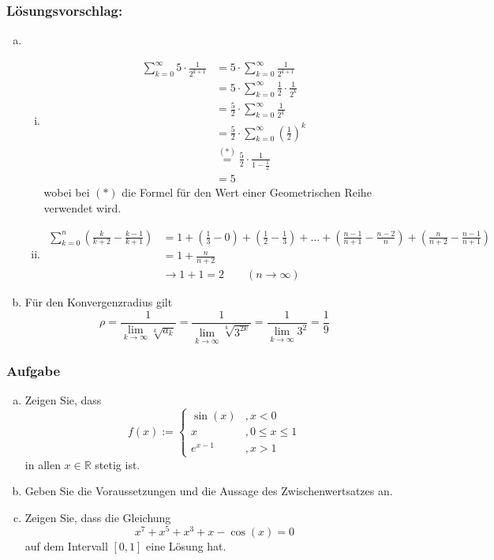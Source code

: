 \documentclass[a4paper,11pt]{scrartcl}
\newcounter{auf}
\newcommand{\Aufgabe}%
        {\addtocounter{auf}{1} \subsubsection*{\rmfamily  Aufgabe \theauf \hspace{1em}} }
\newcommand{\RR}{\mathbb{R}}
\begin{document}
\subsubsection*{Lösungsvorschlag:}
\begin{enumerate}[a)]
\item 
	\begin{enumerate}[i)]
	\item \begin{align*}
	\sum \limits_{k=0}^\infty 5\cdot \frac{1}{2^{k+1}}&=5 \cdot \sum \limits_{k=0}^\infty \frac{1}{2^{k+1}}\\
	 &=5 \cdot \sum \limits_{k=0}^\infty \frac{1}{2}\cdot\frac{1}{2^{k}} \\
	 &=\frac{5}{2} \cdot \sum \limits_{k=0}^\infty \frac{1}{2^{k}} \\
	 &=\frac{5}{2} \cdot \sum \limits_{k=0}^\infty \left(\frac{1}{2}\right)^{k} \\
	 &\stackrel{(*)}{=}\frac{5}{2} \cdot \frac{1}{1-\frac{1}{2}}\\
	 &=5
	 \end{align*}
	 wobei bei $(*)$ die Formel für den Wert einer Geometrischen Reihe verwendet wird.
	\item \begin{align*}
	\sum \limits_{k=0}^n\left( \frac{k}{k+2}-\frac{k-1}{k+1}\right)&=1+\left( \frac{1}{3}-0\right)+\left(\frac{1}{2}-\frac{1}{3}\right)+...+\left(\frac{n-1}{n+1}-\frac{n-2}{n} \right)+\left(\frac{n}{n+2}-\frac{n-1}{n+1} \right)\\
	&= 1+\frac{n}{n+2}\\
	&\to 1+1=2 \qquad (n \to \infty)
	\end{align*}
	\end{enumerate}
\item Für den Konvergenzradius gilt
$$
\rho=\frac{1}{\lim \limits_{k \to \infty} \sqrt[k]{a_k}}=\frac{1}{\lim \limits_{k \to \infty} \sqrt[k]{3^{2k}}}=\frac{1}{\lim \limits_{k \to \infty} 3^2 }=\frac{1}{9}
$$
\end{enumerate}


\newpage
\Aufgabe 
\begin{enumerate}[a)]
\item Zeigen Sie, dass 
$$
f(x):= \begin{cases} \sin(x) &, x<0\\ x &, 0\le x\le 1 \\ e^{x-1} &, x>1   \end{cases}
$$
in allen $x \in \RR$ stetig ist.
\item Geben Sie die Voraussetzungen und die Aussage des Zwischenwertsatzes an.

\item Zeigen Sie, dass die Gleichung
$$
x^7+x^5+x^3+x-\cos(x)=0
$$
auf dem Intervall $[0,1]$ eine Lösung hat.
\end{enumerate}
\end{document}
